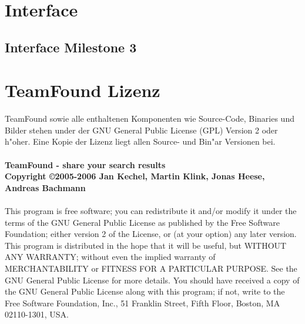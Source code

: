 \chapter{Interface}
\section{Interface Milestone 3}
\label{interface3}

\chapter{TeamFound Lizenz}
TeamFound sowie alle enthaltenen Komponenten wie Source-Code, Binaries und Bilder stehen under der GNU General Public License (GPL) Version 2 oder h"oher. Eine Kopie der Lizenz liegt allen Source- und Bin"ar Versionen bei.\\
\\
\textbf{TeamFound - share your search results}\\
\textbf{Copyright \copyright 2005-2006 Jan Kechel, Martin Klink, Jonas Heese, Andreas Bachmann}\\
\\
This program is free software; you can redistribute it and/or
modify it under the terms of the GNU General Public License
as published by the Free Software Foundation; either version 2
of the License, or (at your option) any later version.
This program is distributed in the hope that it will be useful,
but WITHOUT ANY WARRANTY; without even the implied warranty of
MERCHANTABILITY or FITNESS FOR A PARTICULAR PURPOSE. See the
GNU General Public License for more details.
You should have received a copy of the GNU General Public License
along with this program; if not, write to the Free Software
Foundation, Inc., 51 Franklin Street, Fifth Floor, Boston, MA 02110-1301, USA.



